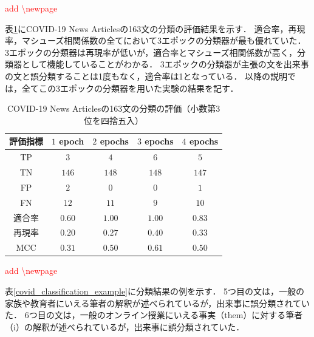 \documentclass[12pt,a4j]{jreport}
\begin{document}
\textcolor{red}{add \textbackslash newpage}
\newpage

表\ref{covid_classification_evaluation}にCOVID-19 News Articlesの163文の分類の評価結果を示す．
適合率，再現率，マシューズ相関係数の全てにおいて3エポックの分類器が最も優れていた．
3エポックの分類器は再現率が低いが，適合率とマシューズ相関係数が高く，分類器として機能していることがわかる．
3エポックの分類器が主張の文を出来事の文と誤分類することは1度もなく，適合率は1となっている．
以降の説明では，全てこの3エポックの分類器を用いた実験の結果を記す．

\begin{table}[H]
  \caption{
    COVID-19 News Articlesの163文の分類の評価（小数第3位を四捨五入）
  }
  \centering
  \vspace{4mm}
    \begin{tabular}{ccccc}
    \hline
    評価指標 & $1$ epoch & $2$ epochs & $3$ epochs & $4$ epochs
    \\
    \hline
    TP & $3$ & $4$ & $6$ & $5$
    \\
    TN & $146$ & $148$ & $148$ & $147$
    \\
    FP & $2$ & $0$ & $0$ & $1$
    \\
    FN & $12$ & $11$ & $9$ & $10$
    \\
    適合率 & $0.60$ & $\mathbf{1.00}$ & $\mathbf{1.00}$ & $0.83$
    \\
    再現率 & $0.20$ & $0.27$ & $\mathbf{0.40}$ & $0.33$
    \\
    MCC & $0.31$ & $0.50$ & $\mathbf{0.61}$ & $0.50$
    \\
    \hline
    \end{tabular}
  \label{covid_classification_evaluation}
\end{table}

\textcolor{red}{add \textbackslash newpage}
\newpage

表\ref{covid_classification_example}に分類結果の例を示す．
5つ目の文は，一般の家族や教育者にいえる筆者の解釈が述べられているが，出来事に誤分類されていた．
6つ目の文は，一般のオンライン授業にいえる事実（them）に対する筆者（i）の解釈が述べられているが，出来事に誤分類されていた．
\end{document}
